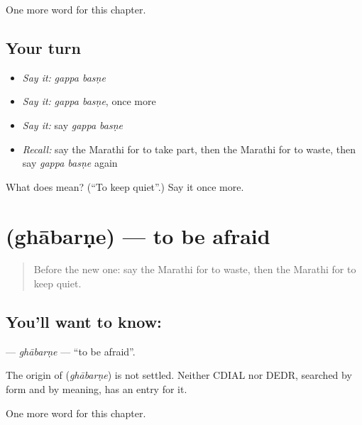 \begin{grammarlens}[title={What you've built}]
One more word for this chapter.
\end{grammarlens}

\subsection*{Your turn}
\begin{itemize}
\raggedright
  \item \emph{Say it:} \emph{gappa basṇe}
  \item \emph{Say it:} \emph{gappa basṇe}, once more
  \item \emph{Say it:} say \emph{gappa basṇe}
  \item \emph{Recall:} say the Marathi for to take part, then the Marathi for to waste, then say \emph{gappa basṇe} again
\end{itemize}

\begin{tcolorbox}[breakable,colback=teal!4,colframe=teal!35!black,title={Before you move on}]
What does   mean? (\textquotedblleft{}To keep quiet\textquotedblright{}.) Say it once more.
\end{tcolorbox}
\section[\texorpdfstring{\mr{घाबरणे} (ghābarṇe)}{घाबरणे (ghābarṇe)}]{ (ghābarṇe) — to be afraid}

\label{lesson:MR-C166-ghabarne}



\begin{quote}
Before the new one: say the Marathi for to waste, then the Marathi for to keep quiet.
\end{quote}

\subsection*{You'll want to know: }
\textbf{} — \emph{ghābarṇe} — \textquotedblleft{}to be afraid\textquotedblright{}.

\begin{cousinweb}
The origin of \textbf{} (\emph{ghābarṇe}) is not settled. Neither CDIAL nor DEDR, searched by form and by meaning, has an entry for it.
\end{cousinweb}

\begin{grammarlens}[title={What you've built}]
One more word for this chapter.
\end{grammarlens}

